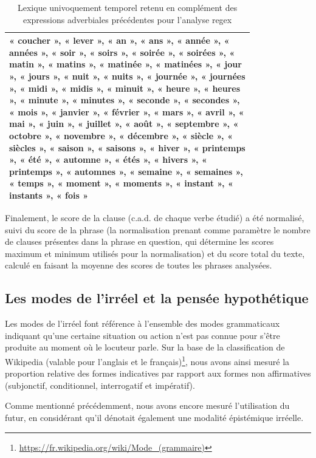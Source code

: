 \begin{table}[H]
\caption{Lexique univoquement temporel retenu en complément des expressions adverbiales précédentes pour l'analyse regex}
\centering
\bigskip
\renewcommand{\arraystretch}{1.5} %
\begin{tabular}{|p{0.8\linewidth}|}
    \hline
    « coucher », « lever », « an », « ans », « année », « années », « soir », « soirs », « soirée », « soirées », « matin », « matins », « matinée », « matinées », « jour », « jours », « nuit », « nuits », « journée », « journées », « midi », « midis », « minuit », « heure », « heures », « minute », « minutes », « seconde », « secondes », « mois », « janvier », « février », « mars », « avril », « mai », « juin », « juillet », « août », « septembre », « octobre », « novembre », « décembre », « siècle », « siècles », « saison », « saisons », « hiver », « printemps », « été », « automne », « étés », « hivers », « printemps », « automnes », « semaine », « semaines », « temps », « moment », « moments », « instant », « instants », « fois » \\
    \hline
\end{tabular}
 \label{Tab:adv_temp_bis}
\end{table}

Finalement, le score de la clause (c.a.d. de chaque verbe étudié) a été normalisé, suivi du score de la phrase (la normalisation prenant comme paramètre le nombre de clauses présentes dans la phrase en question, qui détermine les scores maximum et minimum utilisés pour la normalisation) et du score total du texte, calculé en faisant la moyenne des scores de toutes les phrases analysées.

\subsection{Les modes de l’irréel et la pensée hypothétique}

Les modes de l’irréel font référence à l'ensemble des modes grammaticaux indiquant qu'une certaine situation ou action n'est pas connue pour s'être produite au moment où le locuteur parle. Sur la base de la classification de Wikipedia (valable pour l'anglais et le français)\footnote{\url{https://fr.wikipedia.org/wiki/Mode_(grammaire)}}, nous avons ainsi mesuré la proportion relative des formes indicatives par rapport aux formes non affirmatives (subjonctif, conditionnel, interrogatif et impératif). 

Comme mentionné précédemment, nous avons encore mesuré l'utilisation du futur, en considérant qu'il dénotait également une modalité épistémique irréelle.

